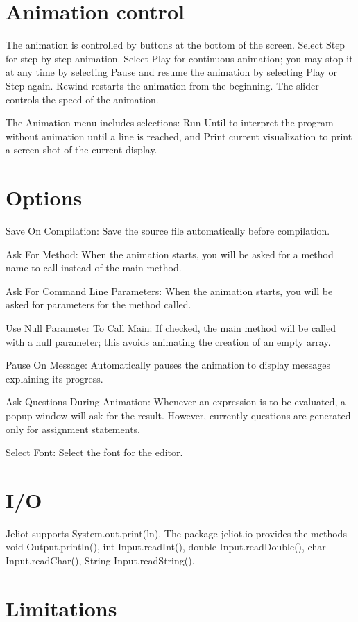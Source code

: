 \documentclass{article}
\begin{document}
\section{Animation control}
The animation is controlled by buttons at the bottom of the screen. Select Step 
for step-by-step animation. Select Play for continuous animation; you may stop 
it at any time by selecting Pause and resume the animation by selecting Play 
or Step again. Rewind restarts the animation from the beginning. The slider controls 
the speed of the animation.

The Animation menu includes selections: Run Until to interpret the program
without animation until a line is reached, and Print current visualization to
print a screen shot of the current display.

\section{Options}

Save On Compilation: Save the source file automatically before compilation.

Ask For Method: When the animation starts, you will be asked for a method name
to call instead of the main method.

Ask For Command Line Parameters: When the animation starts, you will be asked
for parameters for the method called.

Use Null Parameter To Call Main: If checked, the main method will be called 
with a null parameter; this avoids animating the creation of an empty array.

Pause On Message: Automatically pauses the animation to display messages
explaining its progress.

Ask Questions During Animation: Whenever an expression is to be evaluated, a 
popup window will ask for the result. However, currently questions are generated only for assignment statements.

Select Font: Select the font for the editor.

\section{I/O}

Jeliot supports System.out.print(ln). The package jeliot.io provides the 
methods void Output.println(), int Input.readInt(), double Input.readDouble(), 
char Input.readChar(), String Input.readString().

\section{Limitations}
\end{document}
